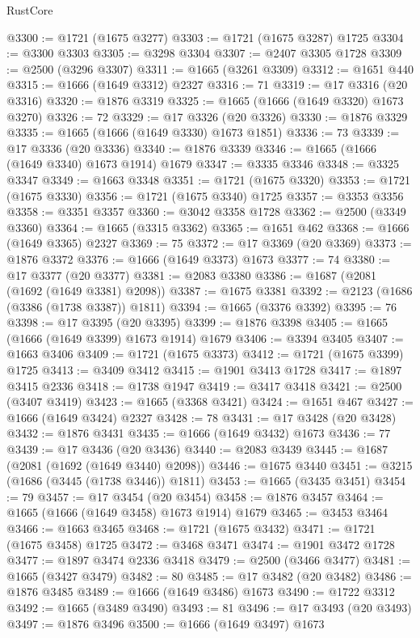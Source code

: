 \begin{lexlean}{RustCore}
\begin{coremodule}
@3300 := @1721 (@1675 @3277)
@3303 := @1721 (@1675 @3287) @1725
@3304 := @3300 @3303
@3305 := @3298 @3304
@3307 := @2407 @3305 @1728
@3309 := @2500 (@3296 @3307)
@3311 := @1665 (@3261 @3309)
@3312 := @1651 @440
@3315 := @1666 (@1649 @3312) @2327
@3316 := 71
@3319 := @17 @3316 (@20 @3316)
@3320 := @1876 @3319
@3325 := @1665 (@1666 (@1649 @3320) @1673 @3270)
@3326 := 72
@3329 := @17 @3326 (@20 @3326)
@3330 := @1876 @3329
@3335 := @1665 (@1666 (@1649 @3330) @1673 @1851)
@3336 := 73
@3339 := @17 @3336 (@20 @3336)
@3340 := @1876 @3339
@3346 := @1665 (@1666 (@1649 @3340) @1673 @1914) @1679
@3347 := @3335 @3346
@3348 := @3325 @3347
@3349 := @1663 @3348
@3351 := @1721 (@1675 @3320)
@3353 := @1721 (@1675 @3330)
@3356 := @1721 (@1675 @3340) @1725
@3357 := @3353 @3356
@3358 := @3351 @3357
@3360 := @3042 @3358 @1728
@3362 := @2500 (@3349 @3360)
@3364 := @1665 (@3315 @3362)
@3365 := @1651 @462
@3368 := @1666 (@1649 @3365) @2327
@3369 := 75
@3372 := @17 @3369 (@20 @3369)
@3373 := @1876 @3372
@3376 := @1666 (@1649 @3373) @1673
@3377 := 74
@3380 := @17 @3377 (@20 @3377)
@3381 := @2083 @3380
@3386 := @1687 (@2081 (@1692 (@1649 @3381) @2098))
@3387 := @1675 @3381
@3392 := @2123 (@1686 (@3386 (@1738 @3387)) @1811)
@3394 := @1665 (@3376 @3392)
@3395 := 76
@3398 := @17 @3395 (@20 @3395)
@3399 := @1876 @3398
@3405 := @1665 (@1666 (@1649 @3399) @1673 @1914) @1679
@3406 := @3394 @3405
@3407 := @1663 @3406
@3409 := @1721 (@1675 @3373)
@3412 := @1721 (@1675 @3399) @1725
@3413 := @3409 @3412
@3415 := @1901 @3413 @1728
@3417 := @1897 @3415 @2336
@3418 := @1738 @1947
@3419 := @3417 @3418
@3421 := @2500 (@3407 @3419)
@3423 := @1665 (@3368 @3421)
@3424 := @1651 @467
@3427 := @1666 (@1649 @3424) @2327
@3428 := 78
@3431 := @17 @3428 (@20 @3428)
@3432 := @1876 @3431
@3435 := @1666 (@1649 @3432) @1673
@3436 := 77
@3439 := @17 @3436 (@20 @3436)
@3440 := @2083 @3439
@3445 := @1687 (@2081 (@1692 (@1649 @3440) @2098))
@3446 := @1675 @3440
@3451 := @3215 (@1686 (@3445 (@1738 @3446)) @1811)
@3453 := @1665 (@3435 @3451)
@3454 := 79
@3457 := @17 @3454 (@20 @3454)
@3458 := @1876 @3457
@3464 := @1665 (@1666 (@1649 @3458) @1673 @1914) @1679
@3465 := @3453 @3464
@3466 := @1663 @3465
@3468 := @1721 (@1675 @3432)
@3471 := @1721 (@1675 @3458) @1725
@3472 := @3468 @3471
@3474 := @1901 @3472 @1728
@3477 := @1897 @3474 @2336 @3418
@3479 := @2500 (@3466 @3477)
@3481 := @1665 (@3427 @3479)
@3482 := 80
@3485 := @17 @3482 (@20 @3482)
@3486 := @1876 @3485
@3489 := @1666 (@1649 @3486) @1673
@3490 := @1722 @3312
@3492 := @1665 (@3489 @3490)
@3493 := 81
@3496 := @17 @3493 (@20 @3493)
@3497 := @1876 @3496
@3500 := @1666 (@1649 @3497) @1673

\end{coremodule}
\end{lexlean}

